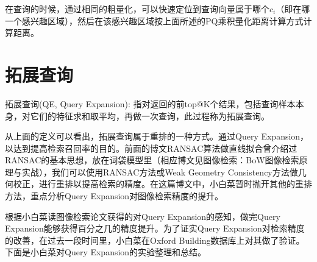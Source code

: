 \documentclass[color=cyan,mathpazo,titlestyle=hang]{elegantbook}
\begin{document}
在查询的时候，通过相同的粗量化，可以快速定位到查询向量属于哪个$c_i$（即在哪一个感兴趣区域），然后在该感兴趣区域按上面所述的PQ乘积量化距离计算方式计算距离。

\section{拓展查询}

拓展查询(QE, Query Expansion): 指对返回的前top@K个结果，包括查询样本本身，对它们的特征求和取平均，再做一次查询，此过程称为拓展查询。

从上面的定义可以看出，拓展查询属于重排的一种方式。通过Query Expansion，以达到提高检索召回率的目的。前面的博文RANSAC算法做直线拟合曾介绍过RANSAC的基本思想，放在词袋模型里（相应博文见图像检索：BoW图像检索原理与实战），我们可以使用RANSAC方法或Weak Geometry Consistency方法做几何校正，进行重排以提高检索的精度。在这篇博文中，小白菜暂时抛开其他的重排方法，重点分析Query Expansion对图像检索精度的提升。

根据小白菜读图像检索论文获得的对Query Expansion的感知，做完Query Expansion能够获得百分之几的精度提升。为了证实Query Expansion对检索精度的改善，在过去一段时间里，小白菜在Oxford Building数据库上对其做了验证。下面是小白菜对Query Expansion的实验整理和总结。



\end{document}

